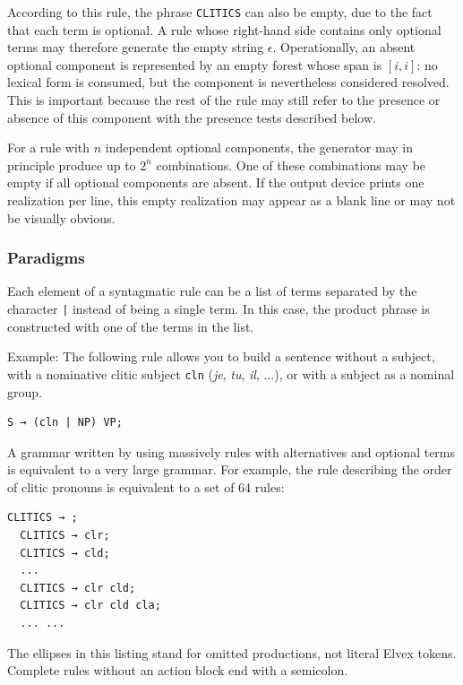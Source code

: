\documentclass[11pt]{article}
\begin{document}
According to this rule, the phrase \texttt{CLITICS} can also be empty,
due to the fact that each term is optional.  A rule whose right-hand side
contains only optional terms may therefore generate the empty string
$\epsilon$. Operationally, an absent optional component is represented by
an empty forest whose span is $[i,i]$: no lexical form is consumed, but the
component is nevertheless considered resolved. This is important because the
rest of the rule may still refer to the presence or absence of this component
with the presence tests described below.

For a rule with $n$ independent optional components, the generator may in
principle produce up to $2^n$ combinations. One of these combinations may be
empty if all optional components are absent. If the output device prints one
realization per line, this empty realization may appear as a blank line or may
not be visually obvious.

\subsubsection*{Paradigms}

Each element of a syntagmatic rule can be a list of terms
separated by the character \verb#|# instead of being a single term. In this
case, the product phrase is constructed with one of the terms in the list.

Example:
The following rule allows you to build a sentence without a subject, with a
nominative clitic subject \texttt{cln} (\textit{je}, \textit{tu},
\textit{il}, $\dots$), or with a subject as a nominal group.

\begin{lstlisting}[numbers=none]
S → (cln | NP) VP;
\end{lstlisting}

A grammar written by using massively rules with alternatives and
optional terms is equivalent to a very large grammar.  For example,
the rule describing the order of clitic pronouns is equivalent to a
set of 64 rules:

\begin{lstlisting}[numbers=none]
  CLITICS → ;
  CLITICS → clr;
  CLITICS → cld;
  ...
  CLITICS → clr cld;
  CLITICS → clr cld cla;
  ... ...
\end{lstlisting}

The ellipses in this listing stand for omitted productions, not literal
Elvex tokens. Complete rules without an action block end with a semicolon.
\end{document}
